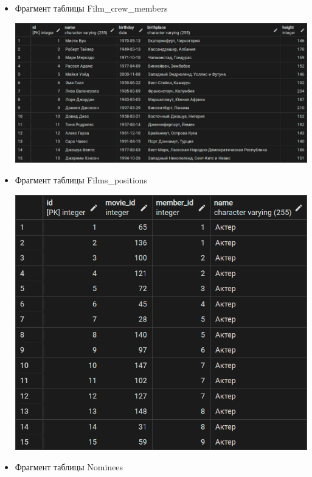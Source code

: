 \documentclass[a4paper,12pt]{article}
\renewcommand{\^}[2]{#1^{\, #2} \kern -1pt}
\newcommand{\1}{\kern 1pt}
\newcommand{\0}{\kern -1pt}
\begin{document}
\begin{itemize}
	
	\item Фрагмент таблицы Film\_crew\_members
	
	\includegraphics[scale=0.3,page=1]{Film_crew_members.png}
	
	
	\item Фрагмент таблицы Films\_positions
	
	\includegraphics[scale=0.3,page=1]{Films_positions.png}
	
	\newpage
	
	\item Фрагмент таблицы Nominees
	

\end{itemize}
\end{document}
